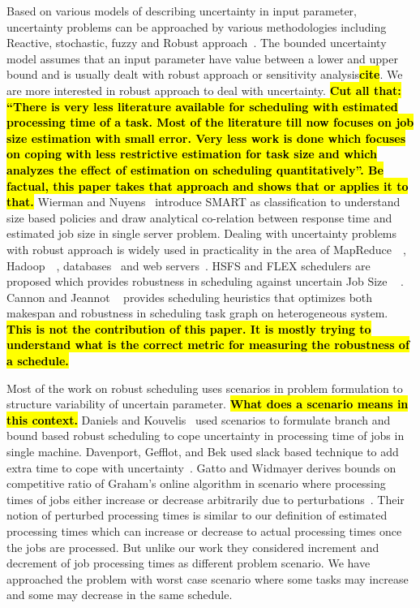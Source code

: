 \documentclass[10pt, conference, compsocconf]{IEEEtran}
\newcommand{\todo}[1]{{\color{red}\textbf{\hl{#1}}\xspace}}
\begin{document}
Based on various models of describing uncertainty in input parameter,
uncertainty problems can be approached by various methodologies
including Reactive, stochastic, fuzzy and Robust
approach~\cite{DBLP:journals/cce/LiI08}. The bounded uncertainty model
assumes that an input parameter have value between a lower and upper
bound and is usually dealt with robust approach or sensitivity
analysis\todo{cite}. We are more interested in robust approach to deal
with uncertainty. \todo{Cut all that: ``There is very less literature
  available for scheduling with estimated processing time of a
  task. Most of the literature till now focuses on job size estimation
  with small error. Very less work is done which focuses on coping
  with less restrictive estimation for task size and which analyzes
  the effect of estimation on scheduling quantitatively''. Be factual,
  this paper takes that approach and shows that or applies it to
  that.} Wierman and Nuyens~\cite{conf/sigmetrics/WiermanN08}
introduce SMART as classification to understand size based policies
and draw analytical co-relation between response time and estimated
job size in single server problem. Dealing with uncertainty problems
with robust approach is widely used in practicality in the area of
MapReduce~\cite{Kavulya:2010:ATP:1844765.1845224}~\cite{Verma:2011:AAR:1998582.1998637},
Hadoop~\cite{Wolf:2010:FSA:2023718.2023720}~\cite{White:2009:HDG:1717298},
databases~\cite{Lipton199518} and web
servers~\cite{Cardellini99dynamicload}. HSFS and FLEX schedulers are
proposed which provides robustness in scheduling against uncertain Job
Size ~\cite{Wolf:2010:FSA:2023718.2023720} \cite{6691554}. Cannon and
Jeannot ~\cite{cj09c} provides scheduling heuristics that optimizes
both makespan and robustness in scheduling task graph on heterogeneous
system. \todo{This is not the contribution of this paper. It is mostly
  trying to understand what is the correct metric for measuring the
  robustness of a schedule. }

Most of the work on robust scheduling uses scenarios in problem
formulation to structure variability of uncertain
parameter. \todo{What does a scenario means in this context.} Daniels
and Kouvelis~\cite{citeulike:8334169} used scenarios to formulate
branch and bound based robust scheduling to cope uncertainty in
processing time of jobs in single machine. Davenport, Gefflot, and Bek
used slack based technique to add extra time to cope with
uncertainty~\cite{Davenport_slack-basedtechniques}. Gatto and Widmayer
derives bounds on competitive ratio of Graham’s online algorithm in
scenario where processing times of jobs either increase or decrease
arbitrarily due to perturbations~\cite{Gatto07}.  Their notion of
perturbed processing times is similar to our definition of estimated
processing times which can increase or decrease to actual processing
times once the jobs are processed. But unlike our work they considered
increment and decrement of job processing times as different problem
scenario. We have approached the problem with worst case scenario
where some tasks may increase and some may decrease in the same
schedule.
  
\end{document}
